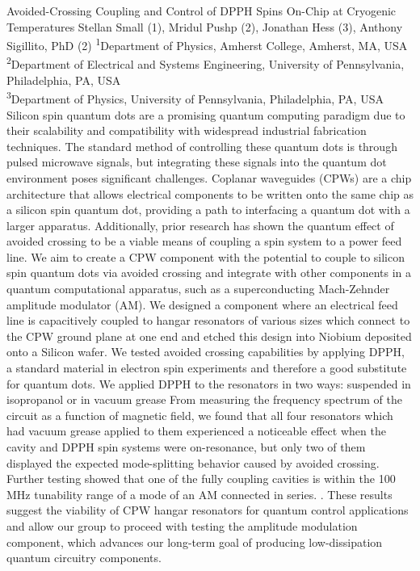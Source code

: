 \makeabstract
{
Avoided-Crossing Coupling and Control of DPPH Spins On-Chip at Cryogenic Temperatures
}
{
Stellan Small (1), Mridul Pushp (2), Jonathan Hess (3), Anthony Sigillito, PhD (2)
}
{
\textsuperscript{1}Department of Physics, Amherst College, Amherst, MA, USA\\
\textsuperscript{2}Department of Electrical and Systems Engineering, University of Pennsylvania, Philadelphia, PA, USA\\
\textsuperscript{3}Department of Physics, University of Pennsylvania, Philadelphia, PA, USA
}
{
Silicon spin quantum dots are a promising quantum computing paradigm due to their scalability and compatibility with widespread industrial fabrication techniques. The standard method of controlling these quantum dots is through pulsed microwave signals, but integrating these signals into the quantum dot environment poses significant challenges. Coplanar waveguides (CPWs) are a chip architecture that allows electrical components to be written onto the same chip as a silicon spin quantum dot, providing a path to interfacing a quantum dot with a larger apparatus. Additionally, prior research has shown the quantum effect of avoided crossing to be a viable means of coupling a spin system to a power feed line. We aim to create a CPW component with the potential to couple to silicon spin quantum dots via avoided crossing and integrate with other components in a quantum computational apparatus, such as a superconducting Mach-Zehnder amplitude modulator (AM). 
}
{
We designed a component where an electrical feed line is capacitively coupled to hangar resonators of various sizes which connect to the CPW ground plane at one end and etched this design into Niobium deposited onto a Silicon wafer. We tested avoided crossing capabilities by applying DPPH, a standard material in electron spin experiments and therefore a good substitute for quantum dots. We applied DPPH to the resonators in two ways: suspended in isopropanol or in vacuum grease
}
{
From measuring the frequency spectrum of the circuit as a function of magnetic field, we found that all four resonators which had vacuum grease applied to them experienced a noticeable effect when the cavity and DPPH spin systems were on-resonance, but only two of them displayed the expected mode-splitting behavior caused by avoided crossing. Further testing showed that one of the fully coupling cavities is within the 100 MHz tunability range of a mode of an AM connected in series.
}
{
. These results suggest the viability of CPW hangar resonators for quantum control applications and allow our group to proceed with testing the amplitude modulation component, which advances our long-term goal of producing low-dissipation quantum circuitry components.
}

\newpage
